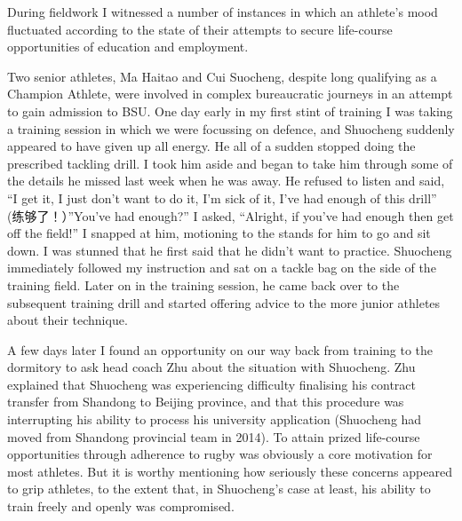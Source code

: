 \begin{CJK}{UTF8}{gbsn}
During fieldwork I witnessed a number of instances in which an athlete's mood fluctuated according to the state of their attempts to secure life-course opportunities of education and employment.

Two senior athletes, Ma Haitao and Cui Suocheng, despite long qualifying as a Champion Athlete, were involved in complex bureaucratic journeys in an attempt to gain admission to BSU.  One day early in my first stint of training I was taking a training session in which we were focussing on defence, and Shuocheng suddenly appeared to have given up all energy.  He all of a sudden stopped doing the prescribed tackling drill.  I took him aside and began to take him through some of the details he missed last week when he was away.  He refused to listen and said, ``I get it, I just don’t want to do it, I’m sick of it, I’ve had enough of this drill'' (练够了！）''You’ve had enough?'' I asked, ``Alright, if you’ve had enough then get off the field!''  I snapped at him, motioning to the stands for him to go and sit down. I was stunned that he first said that he didn’t want to practice.  Shuocheng immediately followed my instruction and sat on a tackle bag on the side of the training field.  Later on in the training session, he came back over to the subsequent training drill and started offering advice to the more junior athletes about their technique.

A few days later I found an opportunity on our way back from training to the dormitory to ask head coach Zhu about the situation with Shuocheng.  Zhu explained that Shuocheng was experiencing difficulty finalising his contract transfer from Shandong to Beijing province, and that this procedure was interrupting his ability to process his university application (Shuocheng had moved from Shandong provincial team in 2014). To attain prized life-course opportunities through adherence to rugby was obviously a core motivation for most athletes.  But it is worthy mentioning how seriously these concerns appeared to grip athletes, to the extent that, in Shuocheng's case at least, his ability to train freely and openly was compromised.


\end{CJK}
